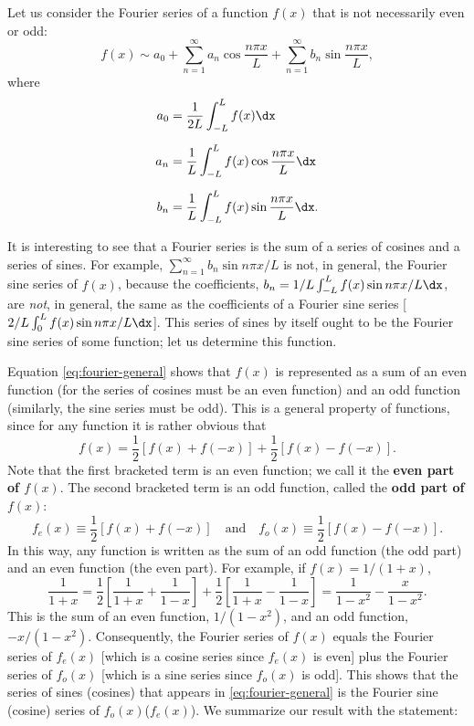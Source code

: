 Let us consider the Fourier series of a function $f(x)$ that is not necessarily even or odd:
\begin{equation}
\label{eq:fourier-general}
f(x) \sim a_0 + \sum_{n=1}^{\infty} a_n \cos \frac{n\pi x}{L} + \sum_{n=1}^{\infty} b_n \sin \frac{n\pi x}{L},
\end{equation}
where
\begin{align*}
a_0 &= \frac{1}{2L} \int_{-L}^{L} f(x) \dx \\[6pt]
a_n &= \frac{1}{L} \int_{-L}^{L} f(x) \cos \frac{n\pi x}{L} \dx \\[6pt]
b_n &= \frac{1}{L} \int_{-L}^{L} f(x) \sin \frac{n\pi x}{L} \dx.
\end{align*}

It is interesting to see that a Fourier series is the sum of a series of cosines and a series of sines.  For example, $\sum_{n=1}^{\infty} b_n \sin n\pi x/L$ is not, in general, the Fourier sine series of $f(x)$, because the coefficients, $b_n = 1/L \int_{-L}^{L} f(x) \sin n\pi x/L \dx$, are \textit{not}, in general, the same as the coefficients of a Fourier sine series [$2/L \int_0^{L} f(x) \sin n\pi x/L \dx$].  This series of sines by itself ought to be the Fourier sine series of some function; let us determine this function.

Equation \eqref{eq:fourier-general} shows that $f(x)$ is represented as a sum of an even function (for the series of cosines must be an even function) and an odd function (similarly, the sine series must be odd).  This is a general property of functions, since for any function it is rather obvious that
\begin{equation}
\label{eq:even-odd-decomp}
f(x) = \frac{1}{2}\left[f(x) + f(-x)\right] + \frac{1}{2}\left[f(x) - f(-x)\right].
\end{equation}
Note that the first bracketed term is an even function; we call it the \textbf{even part of $f(x)$}.  The second bracketed term is an odd function, called the \textbf{odd part of $f(x)$}:
\begin{equation}
\label{eq:even-odd-defs}
f_e(x) \equiv \frac{1}{2}\left[f(x) + f(-x)\right] \quad \text{and} \quad f_o(x) \equiv \frac{1}{2}\left[f(x) - f(-x)\right].
\end{equation}
In this way, any function is written as the sum of an odd function (the odd part) and an even function (the even part).  For example, if $f(x) = 1/(1+x)$,
\[
\frac{1}{1+x} = \frac{1}{2}\left[\frac{1}{1+x} + \frac{1}{1-x}\right] + \frac{1}{2}\left[\frac{1}{1+x} - \frac{1}{1-x}\right] = \frac{1}{1-x^2} - \frac{x}{1-x^2}.
\]
This is the sum of an even function, $1/(1-x^2)$, and an odd function, $-x/(1-x^2)$.  Consequently, the Fourier series of $f(x)$ equals the Fourier series of $f_e(x)$ [which is a cosine series since $f_e(x)$ is even] plus the Fourier series of $f_o(x)$ [which is a sine series since $f_o(x)$ is odd].  This shows that the series of sines (cosines) that appears in \eqref{eq:fourier-general} is the Fourier sine (cosine) series of $f_o(x)$($f_e(x)$).  We summarize our result with the statement:

